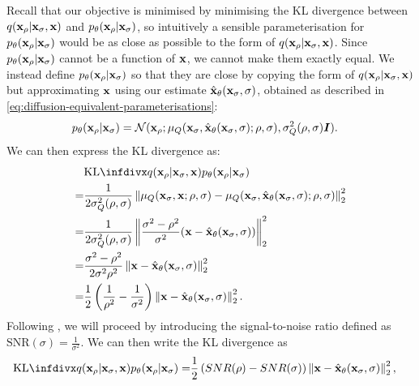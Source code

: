 Recall that our objective is minimised by minimising the KL divergence between $q({\mathbf{x}}_\rho|{\mathbf{x}}_\sigma,{\mathbf{x}})$ and $p_\theta({\mathbf{x}}_{\rho}|{\mathbf{x}}_{\sigma})$, so intuitively a sensible parameterisation for $p_\theta({\mathbf{x}}_\rho|{\mathbf{x}}_\sigma)$ would be as close as possible to the form of $q({\mathbf{x}}_\rho|{\mathbf{x}}_\sigma,{\mathbf{x}})$. Since $p_\theta({\mathbf{x}}_{\rho}|{\mathbf{x}}_{\sigma})$ cannot be a function of ${\mathbf{x}}$, we cannot make them exactly equal. We instead define $p_\theta({\mathbf{x}}_\rho|{\mathbf{x}}_\sigma)$ so that they are close by copying the form of $q({\mathbf{x}}_\rho|{\mathbf{x}}_\sigma,{\mathbf{x}})$ but approximating ${\mathbf{x}}$ using our estimate $\hat{{\mathbf{x}}}_\theta({\mathbf{x}}_\sigma, \sigma)$, obtained as described in \cref{eq:diffusion-equivalent-parameterisations}:
\begin{align}
    p_\theta({\mathbf{x}}_{\rho} | {\mathbf{x}}_{\sigma}) &= {\mathcal{N}}( {\mathbf{x}}_{\rho}; \mathbf{\mu}_Q({\mathbf{x}}_\sigma, \hat{{\mathbf{x}}}_\theta({\mathbf{x}}_\sigma, \sigma); \rho, \sigma), \sigma_Q^2(\rho, \sigma) {\bm{I}} ).
\end{align}
We can then express the KL divergence as:
\begin{align}
    &\kl{q(\rvx_{\rho} | \rvx_{\sigma}, \rvx)}{p_\theta(\rvx_{\rho} | \rvx_{\sigma})} \\ 
    = &\frac{1}{2 \sigma_Q^2(\rho, \sigma)} \left\| \mathbf{\mu}_Q(\rvx_\sigma, \rvx; \rho, \sigma) - \mathbf{\mu}_Q(\rvx_\sigma, \predx_\theta(\rvx_\sigma, \sigma); \rho, \sigma) \right\|_2^2 \\
    = &\frac{1}{2 \sigma_Q^2(\rho, \sigma)} \left\| \frac{\sigma^2-\rho^2}{\sigma^2} ( \rvx - \predx_\theta(\rvx_\sigma, \sigma) ) \right\|_2^2 \\
    = &\frac{\sigma^2-\rho^2}{2 \sigma^2 \rho^2} \left\| \rvx - \predx_\theta(\rvx_\sigma, \sigma) \right\|_2^2 \\
    = &\frac{1}{2} \left( \frac{1}{\rho^2} - \frac{1}{\sigma^2} \right) \left\| \rvx - \predx_\theta(\rvx_\sigma, \sigma) \right\|_2^2.
\end{align}
Following \citet{kingma2021variational}, we will proceed by introducing the signal-to-noise ratio defined as $\text{SNR}(\sigma) = \frac{1}{\sigma^2}$. We can then write the KL divergence as
\begin{align}
\kl{q(\rvx_{\rho} | \rvx_{\sigma}, \rvx)}{p_\theta(\rvx_{\rho} | \rvx_{\sigma})} = &\frac{1}{2} \left( SNR(\rho) - SNR(\sigma) \right) \left\| \rvx - \predx_\theta(\rvx_\sigma, \sigma) \right\|_2^2,
\end{align}
